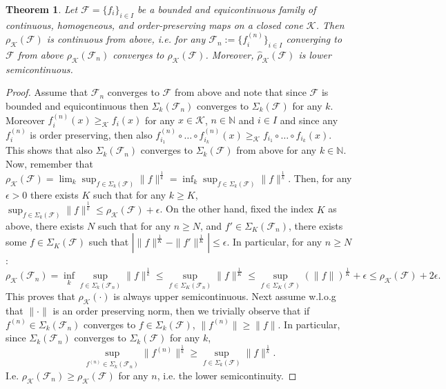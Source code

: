 \documentclass{article}
\newtheorem{theorem}{Theorem}[section]
\newcommand{\N}{\mathbb{N}}
\newcommand{\family}{\mathcal{F}}
\newcommand{\cradius}{\rho_{\cone}}
\newcommand{\cgradius}{\widehat{\rho}_{\cone}}
\newcommand{\cone}{\mathcal{K}}
\newcommand{\cgeq}{\geq_{\cone}}
\begin{document}
\begin{theorem}\label{Theorem_continuity_of_spectral_radius}
    Let $\family=\{f_i\}_{i\in I}$ be a bounded and equicontinuous family of continuous, homogeneous, and order-preserving maps on a closed cone $\cone$. Then $\cradius(\family)$ is continuous from above, i.e. for any $\family_n:=\{f_i^{(n)}\}_{i\in I}$ converging to $\family$ from above $\cradius(\family_n)$ converges to $\cradius(\family)$. Moreover, $\cgradius(\family)$ is lower semicontinuous. 
\end{theorem}
\begin{proof}
    Assume that $\family_n$ converges to $\family$ from above and note that since $\family$ is bounded and equicontinuous then $\Sigma_k(\family_n)$ converges to $\Sigma_k(\family)$ for any $k$. Moreover $f_i^{(n)}(x) \cgeq f_i(x)$ for any $x\in \cone$,  $n\in \N$ and $i\in I$ and since any $f_i^{(n)}$ is order preserving, then also $f_{i_1}^{(n)}\circ\dots \circ f_{i_k}^{(n)} (x)\cgeq f_{i_1}\circ\dots \circ f_{i_k} (x)$. This shows that also $\Sigma_k(\family_n)$ converges to $\Sigma_k(\family)$ from above for any $k\in \N$.
%
Now, remember that $\cradius(\family)=\lim_k\sup_{f\in\Sigma_k(\family)}\big\|f\big\|^{\frac{1}{k}}=\inf_k\sup_{f\in\Sigma_k(\family)}\big\|f\big\|^{\frac{1}{k}}$.
%
Then, for any $\epsilon>0$ there exists $K$ such that for any $k\geq K$,  $\sup_{f\in \Sigma_k(\family)}\|f\|^{\frac{1}{k}}\leq \cradius(\family)+\epsilon$. 
%
On the other hand, fixed the index $K$ as above, there exists $N$ such that for any $n\geq N$, and $f'\in \Sigma_K(\family_n)$, there exists some $f\in \Sigma_K(\family)$ such that  $|\|f\|^{\frac{1}{K}}-\|f'\|^{\frac{1}{K}}|\leq \epsilon$.
%
In particular, for any $n\geq N$:
%
\begin{equation}
\cradius(\family_n)=\inf_k\sup_{f\in\Sigma_k(\family_n)}\|f\|^{\frac{1}{k}}\leq \sup_{f\in \Sigma_K(\family_n)}\|f\|^{\frac{1}{K}}\leq \sup_{f\in \Sigma_K(\family)}(\|f\|)^{\frac{1}{K}}+\epsilon\leq \cradius(\family)+2\epsilon.
\end{equation}
%
This proves that $\cradius(\cdot)$ is always upper semicontinuous.
%
Next assume w.l.o.g that $\|\cdot\|$ is an order preserving norm, then we trivially observe that if $f^{(n)}\in \Sigma_k(\family_n)$ converges to $f\in \Sigma_k(\family)$, $\|f^{(n)}\|\geq \|f\|$.
In particular, since $\Sigma_k(\family_n)$ converges to $\Sigma_k(\family)$ for any $k$, 
\begin{equation}
    \sup_{f^{(n)}\in \Sigma_k(\family_n)}\|f^{(n)}\|^{\frac{1}{k}}\geq \sup_{f\in \Sigma_k(\family)}\|f\|^{\frac{1}{k}}. 
\end{equation}
I.e. $\cradius(\family_n)\geq \cradius(\family)$ for any $n$, i.e. the lower semicontinuity.
%


\end{proof}
\end{document}
